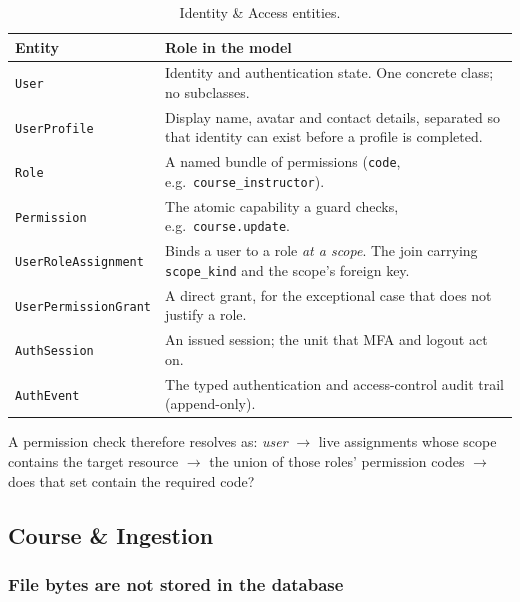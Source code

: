 \begin{table}[H]
\centering
\renewcommand{\arraystretch}{1.25}
\small
\begin{tabular}{|>{\raggedright\arraybackslash}m{}|>{\raggedright\arraybackslash}m{}|}
\hline
\textbf{Entity} & \textbf{Role in the model} \\ \hline
\texttt{User} & Identity and authentication state. One concrete class; no subclasses. \\ \hline
\texttt{UserProfile} & Display name, avatar and contact details, separated so that identity can exist before a profile is completed. \\ \hline
\texttt{Role} & A named bundle of permissions (\texttt{code}, e.g.\ \texttt{course\_instructor}). \\ \hline
\texttt{Permission} & The atomic capability a guard checks, e.g.\ \texttt{course.update}. \\ \hline
\texttt{UserRoleAssignment} & Binds a user to a role \emph{at a scope}. The join carrying \texttt{scope\_kind} and the scope's foreign key. \\ \hline
\texttt{UserPermissionGrant} & A direct grant, for the exceptional case that does not justify a role. \\ \hline
\texttt{AuthSession} & An issued session; the unit that MFA and logout act on. \\ \hline
\texttt{AuthEvent} & The typed authentication and access-control audit trail (append-only). \\ \hline
\end{tabular}
\caption{Identity \& Access entities.}
\label{tab:class_identity}
\end{table}

\noindent A permission check therefore resolves as: \emph{user} $\rightarrow$ live assignments whose scope contains the target resource $\rightarrow$ the union of those roles' permission codes $\rightarrow$ does that set contain the required code?

\subsection{Course \& Ingestion}

\subsubsection{File bytes are not stored in the database}

